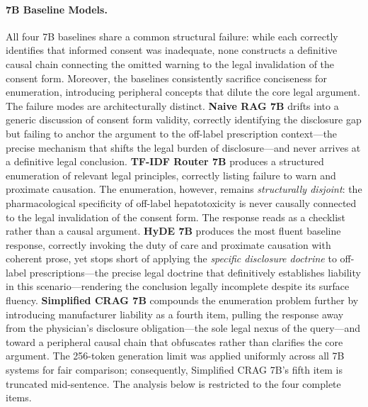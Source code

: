 \documentclass[a4paper,fleql,doubleblind]{cas-sc}
\begin{document}
\paragraph{7B Baseline Models.}
All four 7B baselines share a common structural failure: while each correctly
identifies that informed consent was inadequate, none constructs a definitive
causal chain connecting the omitted warning to the legal invalidation of the
consent form. Moreover, the baselines consistently sacrifice conciseness for
enumeration, introducing peripheral concepts that dilute the core legal
argument. The failure modes are architecturally distinct.
\textbf{Naive RAG 7B} drifts into a generic discussion of consent form
validity, correctly identifying the disclosure gap but failing to anchor the
argument to the off-label prescription context---the precise mechanism that
shifts the legal burden of disclosure---and never arrives at a definitive legal
conclusion.
\textbf{TF-IDF Router 7B} produces a structured enumeration of relevant legal
principles, correctly listing failure to warn and proximate causation.
The enumeration, however, remains \emph{structurally disjoint}: the
pharmacological specificity of off-label hepatotoxicity is never causally
connected to the legal invalidation of the consent form. The response reads
as a checklist rather than a causal argument.
\textbf{HyDE 7B} produces the most fluent baseline response, correctly
invoking the duty of care and proximate causation with coherent prose, yet
stops short of applying the \textit{specific disclosure doctrine} to off-label
prescriptions---the precise legal doctrine that definitively establishes
liability in this scenario---rendering the conclusion legally incomplete despite
its surface fluency.
\textbf{Simplified CRAG 7B} compounds the enumeration problem further by introducing
manufacturer liability as a fourth item, pulling the response away from the
physician's disclosure obligation---the sole legal nexus of the query---and
toward a peripheral causal chain that obfuscates rather than clarifies the
core argument. The 256-token generation limit was applied uniformly across all
7B systems for fair comparison; consequently, Simplified CRAG 7B's fifth item is truncated
mid-sentence. The analysis below is restricted to the four complete items.
\end{document}
